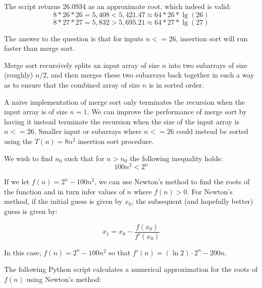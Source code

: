 \documentclass[a4paper,12pt]{article}
\begin{document}
The script returns 26.0934 as an approximate root, which indeed is valid:
\[ 8 * 26 * 26 = 5,408 < 5,421.47 \approx 64 * 26 * \lg(26) \]
\[ 8 * 27 * 27 = 5,832 > 5,695.21 \approx 64 * 27 * \lg(27) \]

The answer to the question is that for inputs $n <= 26$, insertion sort will 
run faster than merge sort.

Merge sort recursively splits an input array of size $n$ into two subarrays 
of size (roughly) $n/2$, and then merges these two subarrays back together in such 
a way as to ensure that the combined array of size $n$ is in sorted order.

A naive implementation of merge sort only terminates the recursion 
when the input array is of size $n=1$. We can improve the performance
of merge sort by having it instead terminate the recursion when the size 
of the input array is $n<=26$.  Smaller input or subarrays where $n <= 26$ could 
instead be sorted using the $T(n) = 8n^2$ insertion sort procedure.

\vspace{5mm}


We wish to find $n_0$ such that for $n > n_0$ the following inequality holds:
\[ 100n^2 < 2^n \]

If we let $f(n) = 2^n - 100n^2$, we can use Newton's method to find the roots of 
the function and in turn infer values of $n$ where $f(n) > 0$. For Newton's method, if 
the initial guess is given by $x_0$, the subsequent (and hopefully better) guess is 
given by:

\[ x_1 = x_0 - \frac{f(x_0)}{f'(x_0)} \]

In this case, $f(n) = 2^n - 100n^2$ so that $f'(n) = (\ln 2) \cdot 2^n - 200 n$.

The following Python script calculates a numerical approximation for the roots of $f(n)$ using Newton's method:
\end{document}
